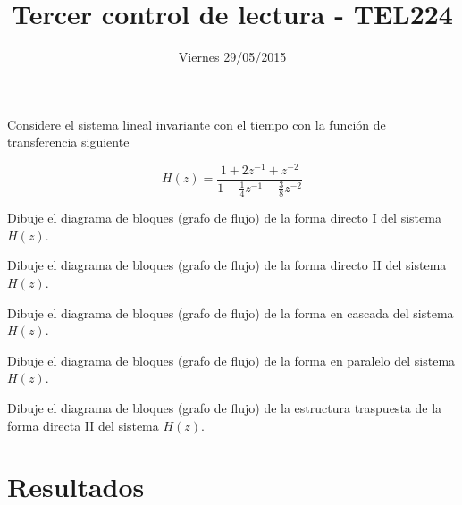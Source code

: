 \documentclass[addpoints]{exam}
\begin{document}
\headrule

\title{Tercer control de lectura - TEL224}
\date{Viernes 29/05/2015}
\maketitle

\vspace{0.1in}
\vspace{0.1in}

Considere el sistema lineal invariante con el tiempo con la función de transferencia siguiente

$$H(z) = \frac{1 + 2 z^{-1} + z^{-2}}{1 - \frac{1}{4} z^{-1} -\frac{3}{8} z^{-2}}$$

\begin{questions}

\question[20]

Dibuje el diagrama de bloques (grafo de flujo) de la forma directo I del sistema \(H(z)\).

\question[20]


Dibuje el diagrama de bloques (grafo de flujo) de la forma directo II del sistema \(H(z)\).

\newpage
\question[20]

Dibuje el diagrama de bloques (grafo de flujo) de la forma en cascada del sistema \(H(z)\).

\question[20]

Dibuje el diagrama de bloques (grafo de flujo) de la forma en paralelo del sistema \(H(z)\).

\newpage
\question[20]

Dibuje el diagrama de bloques (grafo de flujo) de la estructura traspuesta de la forma directa II del sistema \(H(z)\).


\end{questions}

\section*{Resultados}

\begin{center}
\gradetable[v][questions]
\end{center}

\footrule
{}
\end{document}
